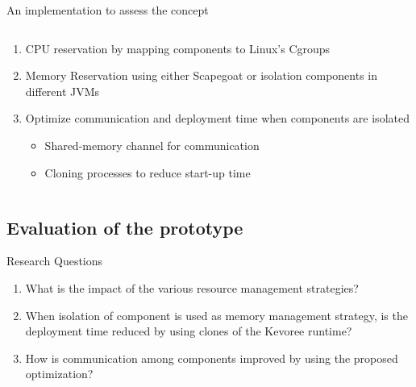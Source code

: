 \documentclass[10pt,xcolor={dvipsnames}]{beamer}
\begin{document}
	\begin{frame}{An implementation to assess the concept}
		\begin{columns}
			\begin{footnotesize}
				\begin{enumerate}
					\item CPU reservation by mapping components to Linux's Cgroups
					\item Memory Reservation using either Scapegoat or isolation components in different JVMs
					\item Optimize communication and deployment time when components are isolated
						\begin{itemize}
							\item Shared-memory channel for communication
							\item Cloning processes to reduce start-up time
						\end{itemize}
				\end{enumerate}
			\end{footnotesize}
		\end{columns}
	\end{frame}
	
	\subsection[Evaluation of the prototype]{Evaluation of the prototype}
	
	\begin{frame}{Research Questions}
		\begin{enumerate}[RQ1]\setlength{\itemsep}{1cm}
			\item What is the impact of the various resource management strategies?
			\item When isolation of component is used as memory management strategy, is the deployment time reduced by using clones of the Kevoree runtime?  
			\item How is communication among components improved by using the proposed optimization?
		\end{enumerate}
	\end{frame}
	
\end{document}
